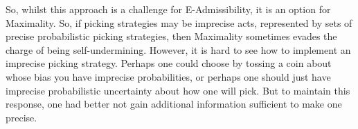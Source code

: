 \documentclass[a4paper]{article}
\newcommand{\todoold}[2][]{\todo[backgroundcolor=white,bordercolor=orange!10,linecolor=gray!10, #1,caption={},textcolor=gray]{Pre-rev: #2}}
\newcommand{\todooldinfo}[2][]{\todoold[#1]{#2}}
\newenvironment{CCM rewritten}
{\begingroup\color{blue}} %
{\endgroup}              %
\begin{document}
	So, whilst this approach is a challenge for E-Admissibility, it is an option for Maximality.  
	So, if picking strategies may be imprecise acts, represented by sets of precise probabilistic picking strategies, then Maximality sometimes evades the charge of being self-undermining. However, it is hard to see how to implement an imprecise picking strategy. Perhaps one could choose by tossing a coin about whose bias you have imprecise probabilities, or perhaps one should just have imprecise probabilistic uncertainty about how one will pick. But to maintain this response, one had better not gain additional information sufficient to make one precise. 
	

	
	
	
\end{document}

